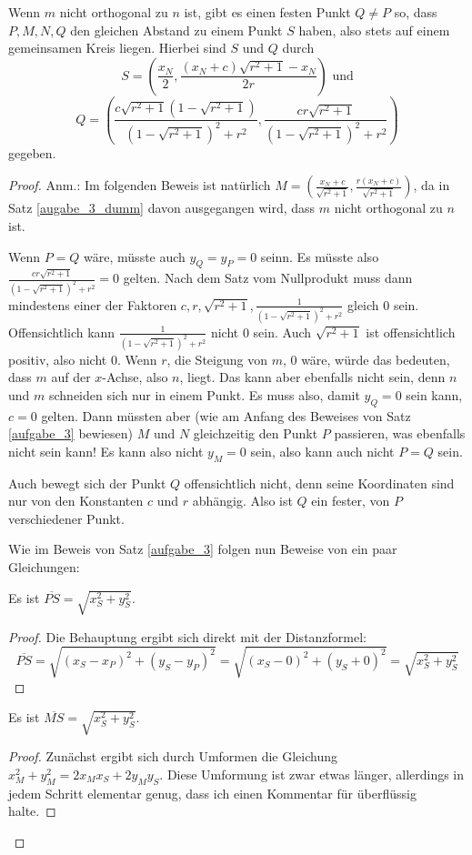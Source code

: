 \begin{thm}\label{augabe_3_dumm}
    Wenn $m$ nicht orthogonal zu $n$ ist, gibt es einen festen Punkt $Q\neq P$ so, dass $P, M, N, Q$ 
    den gleichen Abstand zu einem Punkt $S$ haben, also stets auf einem gemeinsamen Kreis liegen. 
    Hierbei sind $S$ und $Q$ durch
    \[
    S=\left(\frac{x_N}{2},\frac{(x_N+c)\sqrt{r^2+1}-x_N}{2r}\right)\text{ und}
    \]
    \[
    Q=\left(\frac{c\sqrt{r^2+1}\left(1-\sqrt{r^2+1}\right)}{\left(1-\sqrt{r^2+1}\right)^2+r^2}, 
    \frac{cr\sqrt{r^2+1}}{\left(1-\sqrt{r^2+1}\right)^2+r^2}\right)
    \]
    gegeben.
\end{thm}
\begin{proof}
    \renewcommand{\qedsymbol}{$\square$}
    Anm.: Im folgenden Beweis ist natürlich $M=\left( \frac{x_N+c}{\sqrt{r^2+1}} , \frac{r(x_N+c)}{\sqrt{r^2+1}} 
    \right)$, da in Satz \ref{augabe_3_dumm} davon ausgegangen wird, dass $m$ nicht orthogonal zu $n$ ist.

    Wenn $P=Q$ wäre, müsste auch $y_Q=y_P=0$ seinn. Es müsste also $\frac{cr\sqrt{r^2+1}}{(1-\sqrt{r^2+1})^2+r^2}
    =0$ gelten. Nach dem Satz vom Nullprodukt muss dann mindestens einer der Faktoren $c, r, \sqrt{r^2+1}, 
    \frac{1}{(1-\sqrt{r^2+1})^2+r^2}$ gleich 0 sein. Offensichtlich kann $\frac{1}{(1-\sqrt{r^2+1})^2+r^2}$ nicht 0 
    sein. Auch $\sqrt{r^2+1}$ ist offensichtlich positiv, also nicht 0. Wenn $r$, die Steigung von $m$, 0 wäre, 
    würde das bedeuten, dass $m$ auf der $x$-Achse, also $n$, liegt. Das kann aber ebenfalls nicht sein, denn $n$ 
    und $m$ schneiden sich nur in einem Punkt. Es muss also, damit $y_Q=0$ sein kann, $c=0$ gelten. Dann müssten 
    aber (wie am Anfang des Beweises von Satz \ref{aufgabe_3} bewiesen) $M$ und $N$ gleichzeitig den Punkt $P$ 
    passieren, was ebenfalls nicht sein kann! Es kann also nicht $y_M=0$ sein, also kann auch nicht $P=Q$ sein.

    Auch bewegt sich der Punkt $Q$ offensichtlich nicht, denn seine Koordinaten sind nur von den Konstanten $c$ und 
    $r$ abhängig. Also ist $Q$ ein fester, von $P$ verschiedener Punkt.

    Wie im Beweis von Satz \ref{aufgabe_3} folgen nun Beweise von ein paar Gleichungen:
    \begin{lem}\label{dumm_P}
        Es ist $\overline{PS}=\sqrt{x_S^2+y_S^2}$.
    \end{lem}
    \begin{proof}
        Die Behauptung ergibt sich direkt mit der Distanzformel:
        \[
        \overline{PS}=\sqrt{(x_S-x_P)^2+(y_S-y_P)^2}=\sqrt{(x_S-0)^2+(y_S+0)^2}=\sqrt{x_S^2+y_S^2}    
        \]
    \end{proof}
    \begin{lem}\label{dumm_M}
        Es ist $\overline{MS}=\sqrt{x_S^2+y_S^2}$.
    \end{lem}
    \begin{proof}
        Zunächst ergibt sich durch Umformen die Gleichung $x_M^2+y_M^2=2x_Mx_S+2y_My_S$. Diese Umformung ist 
        zwar etwas länger, allerdings in jedem Schritt elementar genug, dass ich einen Kommentar für überflüssig 
        halte.


\end{proof}
\end{proof}
